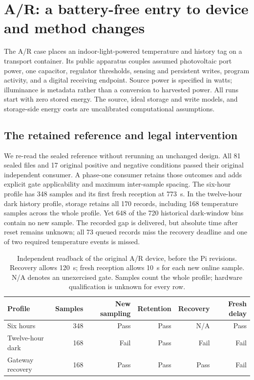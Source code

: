 \section{A/R: a battery-free entry to device and method changes}
\label{sec:phase1-ar}
The A/R case places an indoor-light-powered temperature and history tag on a
transport container. Its public apparatus couples assumed photovoltaic port
power, one capacitor, regulator thresholds, sensing and persistent writes,
program activity, and a digital receiving endpoint. Source power is specified
in watts; illuminance is metadata rather than a conversion to harvested power.
All runs start with zero stored energy. The source, ideal storage and write
models, and storage-side energy costs are uncalibrated computational assumptions.

\subsection{The retained reference and legal intervention}
We re-read the sealed reference without rerunning an unchanged design.
All 81 sealed files and 17 original positive and negative conditions passed
their original independent consumer. A phase-one consumer retains those
outcomes and adds explicit gate applicability and maximum inter-sample spacing.
The six-hour profile has 348 samples and its first fresh reception at 773~s.
In the twelve-hour dark history profile, storage retains all 170 records,
including 168 temperature samples across the whole profile. Yet 648 of the
720 historical dark-window bins contain no new sample. The recorded gap is
delivered, but absolute time after reset remains unknown; all 73 queued records
miss the recovery deadline and one of two required temperature events is missed.

\begin{table}[ht]
\centering\small
\setlength{\tabcolsep}{5pt}
\begin{tabular}{lrrrrr}
\toprule
Profile & Samples & New sampling & Retention & Recovery & Fresh delay\\
\midrule
Six hours & 348 & Pass & Pass & N/A & Pass\\
Twelve-hour dark & 168 & Fail & Pass & Fail & Fail\\
Gateway recovery & 168 & Pass & Pass & Pass & Fail\\
\bottomrule
\end{tabular}
\caption{Independent readback of the original A/R device, before the Pi
revisions. Recovery allows 120~s; fresh reception allows 10~s for each new
online sample. N/A denotes an unexercised gate. Samples count the whole
profile; hardware qualification is unknown for every row.}
\label{tab:phase1-ar}
\end{table}

